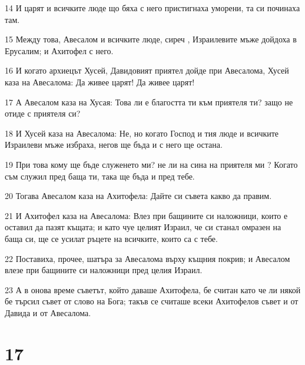 \par 14 И царят и всичките люде що бяха с него пристигнаха уморени, та си починаха там.
\par 15 Между това, Авесалом и всичките люде, сиреч , Израилевите мъже дойдоха в Ерусалим; и Ахитофел с него.
\par 16 И когато архиецът Хусей, Давидовият приятел дойде при Авесалома, Хусей каза на Авесалома: Да живее царят! Да живее царят!
\par 17 А Авесалом каза на Хусая: Това ли е благостта ти към приятеля ти? защо не отиде с приятеля си?
\par 18 И Хусей каза на Авесалома: Не, но когато Господ и тия люде и всичките Израилеви мъже избраха, негов ще бъда и с него ще остана.
\par 19 При това кому ще бъде служенето ми? не ли на сина на приятеля ми ? Когато съм служил пред баща ти, така ще бъда и пред тебе.
\par 20 Тогава Авесалом каза на Ахитофела: Дайте си съвета какво да правим.
\par 21 И Ахитофел каза на Авесалома: Влез при бащините си наложници, които е оставил да пазят къщата; и като чуе целият Израил, че си станал омразен на баща си, ще се усилат ръцете на всичките, които са с тебе.
\par 22 Поставиха, прочее, шатъра за Авесалома върху къщния покрив; и Авесалом влезе при бащините си наложници пред целия Израил.
\par 23 А в онова време съветът, който даваше Ахитофела, бе считан като че ли някой бе търсил съвет от слово на Бога; такъв се считаше всеки Ахитофелов съвет и от Давида и от Авесалома.

\chapter{17}

